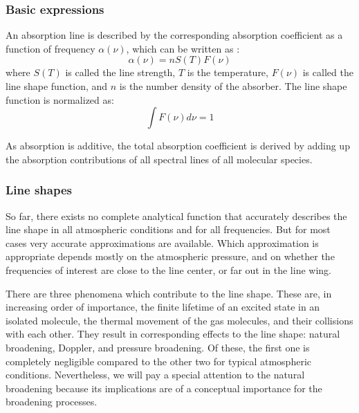 \subsubsection{Basic expressions} 

An absorption line is described by the corresponding 
absorption coefficient as a function of frequency $\alpha(\nu)$, which
can be written as \citep{goodyandyung:89}:
\begin{equation}\label{eq:abs_coeff}
  \alpha(\nu)=nS(T)F(\nu)
\end{equation} 
where $S(T)$ is called the line strength, $T$ is the temperature,
$F(\nu)$ is called the line shape function, and
$n$ is the number density of the absorber. The line shape
function is normalized as:
\begin{equation}\label{eq:abs_theory:line_shape_norm}
  \int F(\nu)d\nu=1
\end{equation}

As absorption is additive, the total absorption coefficient is derived by 
adding up the absorption contributions of all spectral lines of all molecular 
species.

\label{sec:abs_theory:shape}

\subsubsection{Line shapes}

So far, there exists no complete analytical function that accurately
describes the line shape in all atmospheric conditions and for all
frequencies. But for most cases very accurate approximations are
available. Which approximation is appropriate depends mostly on the
atmospheric pressure, and on whether the frequencies of interest are
close to the line center, or far out in the line wing.

There are three phenomena which contribute to the line shape. These
are, in increasing order of importance, the finite lifetime of an
excited state in an isolated molecule, the thermal movement of the gas
molecules, and their collisions with each other. They result in
corresponding effects to the line shape: natural broadening, Doppler,
and pressure broadening. Of these, the first one is completely
negligible compared to the other two for typical atmospheric
conditions. Nevertheless, we will pay a special attention to the
natural broadening because its implications are of a conceptual
importance for the broadening processes.


